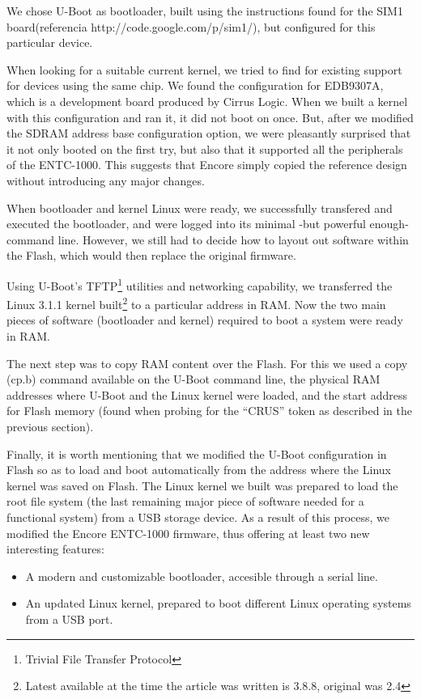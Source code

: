 \documentclass[conference]{IEEEtran}
\begin{document}
We chose U-Boot as bootloader, built 
using the instructions found for the SIM1 board(referencia http://code.google.com/p/sim1/), but
configured for this particular device.

When looking for a suitable current kernel, we tried to find for existing support
for devices using the same chip. We found the configuration for EDB9307A,
which is a development board produced by Cirrus Logic.
When we built a kernel with this configuration and ran it, it did not boot on once.
But, after we modified the SDRAM address base configuration option, we were
pleasantly surprised that it not only booted on the first try, but also that it supported all
the peripherals of the ENTC-1000.
This suggests that Encore simply copied the reference design without introducing any major changes.

When bootloader and kernel Linux were ready, we successfully
transfered and executed the bootloader, and were
logged into its minimal -but powerful enough- command line.
However, we still had to decide how to layout out software within
the Flash, which would then replace the original firmware.

Using U-Boot's TFTP\footnote{Trivial File Transfer Protocol} utilities and networking capability, we
transferred the Linux 3.1.1 kernel built\footnote{Latest available at the time the article was written is 3.8.8, original was 2.4} to a particular address in RAM.
Now the two main pieces of software (bootloader and kernel) required to boot a system
were ready in RAM.

The next step was to copy RAM content over the Flash.
For this we used a copy (cp.b) command available on the U-Boot command line, the physical RAM addresses where U-Boot and the Linux kernel were loaded, and the start address for Flash memory (found when probing for the “CRUS” token as described in the previous section).

Finally, it is worth mentioning that we modified the U-Boot configuration in Flash so as to load and boot automatically from the 
address where the Linux kernel was saved on Flash. The Linux kernel we built was prepared to load the root file 
system (the last remaining major piece of software needed for a functional 
system) from a USB storage device. 
As a result of this process, we modified the Encore
ENTC-1000 firmware, thus offering at least two new interesting features:

\begin{itemize}
\item A modern and customizable bootloader, accesible through a serial line.
\item An updated Linux kernel, prepared to boot different
   Linux operating systems from a USB port.
\end{itemize}
\end{document}
